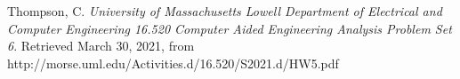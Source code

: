 \documentclass{report}
\begin{document}
\newpage

	\begin{thebibliography}{99\kern\bibindent}
	
	Thompson, C.
	\textit{University of Massachusetts Lowell Department of Electrical and Computer Engineering 16.520 Computer Aided Engineering Analysis Problem Set 6}.
	Retrieved March 30, 2021, from http://morse.uml.edu/Activities.d/16.520/S2021.d/HW5.pdf
	
	\end{thebibliography}
\end{document}

